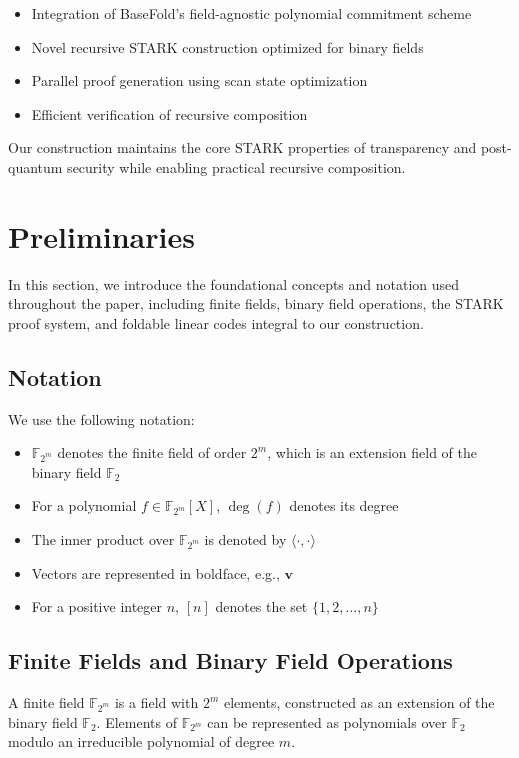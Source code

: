 \documentclass{article}
\theoremstyle{plain}
\theoremstyle{definition}
\theoremstyle{remark}
\theoremstyle{problem}
\begin{document}
\begin{itemize}
    \item Integration of BaseFold's field-agnostic polynomial commitment scheme
    \item Novel recursive STARK construction optimized for binary fields
    \item Parallel proof generation using scan state optimization
    \item Efficient verification of recursive composition
\end{itemize}

Our construction maintains the core STARK properties of transparency and post-quantum security while enabling practical recursive composition.

\section{Preliminaries}

In this section, we introduce the foundational concepts and notation used throughout the paper, including finite fields, binary field operations, the STARK proof system, and foldable linear codes integral to our construction.

\subsection{Notation}

We use the following notation:
\begin{itemize}
    \item $\mathbb{F}_{2^m}$ denotes the finite field of order $2^m$, which is an extension field of the binary field $\mathbb{F}_2$
    \item For a polynomial $f \in \mathbb{F}_{2^m}[X]$, $\deg(f)$ denotes its degree
    \item The inner product over $\mathbb{F}_{2^m}$ is denoted by $\langle \cdot, \cdot \rangle$
    \item Vectors are represented in boldface, e.g., $\mathbf{v}$
    \item For a positive integer $n$, $[n]$ denotes the set $\{1, 2, \dots, n\}$
\end{itemize}

\subsection{Finite Fields and Binary Field Operations}

A finite field $\mathbb{F}_{2^m}$ is a field with $2^m$ elements, constructed as an extension of the binary field $\mathbb{F}_2$. Elements of $\mathbb{F}_{2^m}$ can be represented as polynomials over $\mathbb{F}_2$ modulo an irreducible polynomial of degree $m$.
\end{document}
